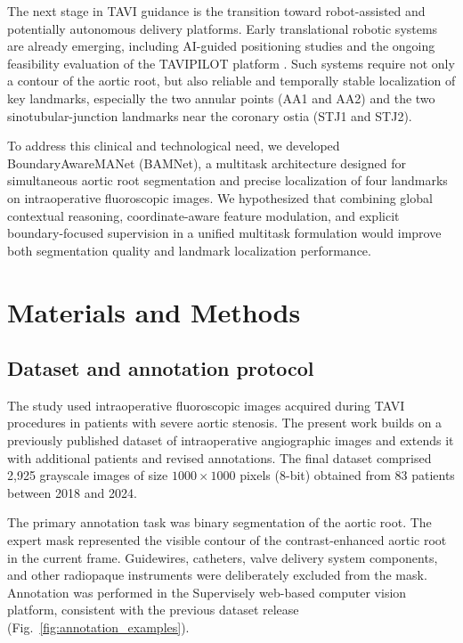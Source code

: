 \documentclass[oneside,pdflatex,sn-mathphys-num]{sn-jnl}
\begin{document}
The next stage in TAVI guidance is the transition toward robot-assisted and potentially autonomous delivery platforms. Early translational robotic systems are already emerging, including AI-guided positioning studies and the ongoing feasibility evaluation of the TAVIPILOT platform \cite{smits2025_autonomous,clinicaltrials_nct07152574}. Such systems require not only a contour of the aortic root, but also reliable and temporally stable localization of key landmarks, especially the two annular points (AA1 and AA2) and the two sinotubular-junction landmarks near the coronary ostia (STJ1 and STJ2).

To address this clinical and technological need, we developed BoundaryAwareMANet (BAMNet), a multitask architecture designed for simultaneous aortic root segmentation and precise localization of four landmarks on intraoperative fluoroscopic images. We hypothesized that combining global contextual reasoning, coordinate-aware feature modulation, and explicit boundary-focused supervision in a unified multitask formulation would improve both segmentation quality and landmark localization performance.

\section{Materials and Methods}\label{sec:methods}

\subsection{Dataset and annotation protocol}\label{subsec:dataset}

The study used intraoperative fluoroscopic images acquired during TAVI procedures in patients with severe aortic stenosis. The present work builds on a previously published dataset of intraoperative angiographic images \cite{laptev2025_dataset} and extends it with additional patients and revised annotations. The final dataset comprised 2,925 grayscale images of size $1000 \times 1000$ pixels (8-bit) obtained from 83 patients between 2018 and 2024.

The primary annotation task was binary segmentation of the aortic root. The expert mask represented the visible contour of the contrast-enhanced aortic root in the current frame. Guidewires, catheters, valve delivery system components, and other radiopaque instruments were deliberately excluded from the mask. Annotation was performed in the Supervisely web-based computer vision platform, consistent with the previous dataset release (Fig.~\ref{fig:annotation_examples}).
\end{document}
